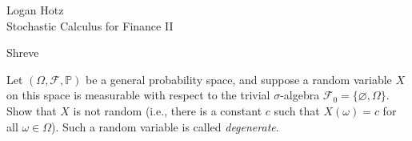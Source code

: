 \documentclass[11pt]{article}
\newcounter{question}[section]
\newenvironment{hwheader}
    {
        \begin{flushright}
            \begin{tcolorbox}[
                width=0.55\textwidth,
                colback=tlightblue,
                colframe=tblue,
                opacityback=0.25,
                enhanced jigsaw
            ]
                \begin{flushright}
                    Logan Hotz \\
    }
    {
                \end{flushright}
            \end{tcolorbox}
        \end{flushright}
        \vspace{4mm}
    }
\begin{document}
    \begin{hwheader}
        Stochastic Calculus for Finance II

        Shreve
    \end{hwheader}





    \begin{hwquestion}
        Let $(\Omega, \mathcal{F}, \mathbb{P})$ be a general probability space, and suppose
        a random variable $X$ on this space is measurable with respect to the trivial
        $\sigma$-algebra $\mathcal{F}_0 = \{ \varnothing, \Omega \}$. Show that $X$ is not
        random (i.e., there is a constant $c$ such that $X(\omega) = c$ for all $\omega \in
        \Omega$). Such a random variable is called \emph{degenerate}.
    \end{hwquestion}
\end{document}
